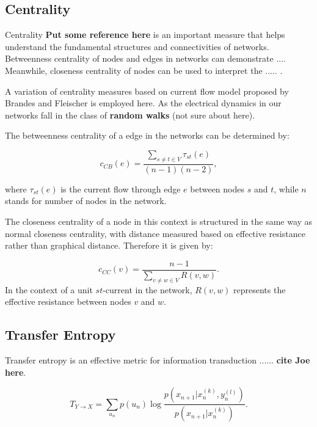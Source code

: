 \documentclass[%
 reprint,
 amsmath,amssymb,
 aps,
]{revtex4-2}
\begin{document}
\subsection{\label{sec:level2} Centrality}
Centrality \textbf{Put some reference here} is an important measure that helps understand the fundamental structures and connectivities of networks. Betweenness centrality of nodes and edges in networks can demonstrate .... Meanwhile, closeness centrality of nodes can be used to interpret the ..... \cite{Newman2010}.

A variation of centrality measures based on current flow model proposed by Brandes and Fleischer \cite{Brandes2005} is employed here. As the electrical dynamics in our networks fall in the class of \textbf{random walks} (not sure about here).

The betweenness centrality of a edge in the networks can be determined by:

\begin{equation}
c_{CB}(e) = \frac{\sum \limits_{s \neq t \in V}\tau_{st}(e)}{(n-1)(n-2)},
\end{equation}

where $\tau_{st}(e)$ is the current flow through edge $e$ between nodes $s$ and $t$, while $n$ stands for number of nodes in the network.

The closeness centrality of a node in this context is structured in the same way as normal closeness centrality, with distance measured based on effective resistance rather than graphical distance. Therefore it is given by:

\begin{equation}
c_{CC}(v) = \frac{n-1}{\sum \limits_{v \neq w \in V} R(v,w)}.
\end{equation}
In the context of a unit $st$-current in the network, $R(v,w)$ represents the effective resistance between nodes $v$ and $w$.



\subsection{\label{sec:level2} Transfer Entropy}

Transfer entropy is an effective metric for information transduction ...... \textbf{cite Joe here}.

\begin{equation}
T_{Y \rightarrow X} = \sum \limits_{u_n} p(u_n) \log \frac{p(x_{n+1}| x_n^{(k)}, y_n^{(l)})}{p(x_{n+1}|x_n^{(k)})}.
\end{equation}
\end{document}
